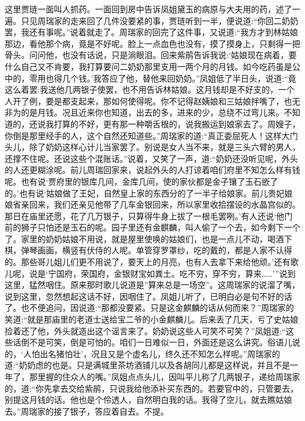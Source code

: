 \begin{parag}
    这里贾琏一面叫人抓药。一面回到房中告诉凤姐黛玉的病原与大夫用的药，述了一遍。只见周瑞家的走来回了几件没要紧的事，贾琏听到一半，便说道:“你回二奶奶罢，我还有事呢。”说着就走了。周瑞家的回完了这件事，又说道:“我方才到林姑娘那边，看他那个病，竟是不好呢。脸上一点血色也没有，摸了摸身上，只剩得一把骨头。问问他，也没有话说，只是淌眼泪。回来紫鹃告诉我说:‘姑娘现在病着，要什么自己又不肯要，我打算要问二奶奶那里支用一两个月的月钱。如今吃药虽是公中的，零用也得几个钱。’我答应了他，替他来回奶奶。”凤姐低了半日头，说道:“竟这么着罢:我送他几两银子使罢，也不用告诉林姑娘。这月钱却是不好支的，一个人开了例，要是都支起来，那如何使得呢。你不记得赵姨娘和三姑娘拌嘴了，也无非为的是月钱。况且近来你也知道，出去的多，进来的少，总绕不过弯儿来。不知道的，还说我打算的不好，更有那一种嚼舌根的，说我搬运到娘家去了。周嫂子，你倒是那里经手的人，这个自然还知道些。”周瑞家的道:“真正委屈死人！这样大门头儿，除了奶奶这样心计儿当家罢了。别说是女人当不来，就是三头六臂的男人，还撑不住呢。还说这些个混账话。”说着，又笑了一声，道:“奶奶还没听见呢，外头的人还更糊涂呢。前儿周瑞回家来，说起外头的人打谅着咱们府里不知怎么样有钱呢。也有说‘贾府里的银库几间，金库几间，使的家伙都是金子镶了玉石嵌了的。’也有说‘姑娘做了王妃，自然皇上家的东西分的了一半子给娘家。前儿贵妃娘娘省亲回来，我们还亲见他带了几车金银回来，所以家里收拾摆设的水晶宫似的。那日在庙里还愿，花了几万银子，只算得牛身上拔了一根毛罢咧。’有人还说‘他门前的狮子只怕还是玉石的呢。园子里还有金麒麟，叫人偷了一个去，如今剩下一个了。家里的奶奶姑娘不用说，就是屋里使唤的姑娘们，也是一点儿不动，喝酒下棋，弹琴画画，横竖有伏侍的人呢。单管穿罗罩纱，吃的戴的，都是人家不认得的。那些哥儿姐儿们更不用说了，要天上的月亮，也有人去拿下来给他顽。’还有歌儿呢，说是‘宁国府，荣国府，金银财宝如粪土。吃不穷，穿不穷，算来……’”说到这里，猛然咽住。原来那时歌儿说道是”算来总是一场空”。这周瑞家的说溜了嘴，说到这里，忽然想起这话不好，因咽住了。凤姐儿听了，已明白必是句不好的话了。也不便追问，因说道:“那都没要紧。只是这金麒麟的话从何而来？”周瑞家的笑道:“就是那庙里的老道士送给宝二爷的小金麒麟儿。后来丢了几天，亏了史姑娘捡着还了他，外头就造出这个谣言来了。奶奶说这些人可笑不可笑？”凤姐道:“这些话倒不是可笑，倒是可怕的。咱们一日难似一日，外面还是这么讲究。俗语儿说的，‘人怕出名猪怕壮’，况且又是个虚名儿，终久还不知怎么样呢。”周瑞家的道:“奶奶虑的也是。只是满城里茶坊酒铺儿以及各胡同儿都是这样说，并且不是一年了，那里握的住众人的嘴。”凤姐点点头儿，因叫平儿称了几两银子，递给周瑞家的，道:“你先拿去交给紫鹃，只说我给他添补买东西的。若要官中的，只管要去，别提这月钱的话。他也是个伶透人，自然明白我的话。我得了空儿，就去瞧姑娘去。”周瑞家的接了银子，答应着自去。不提。
\end{parag}


